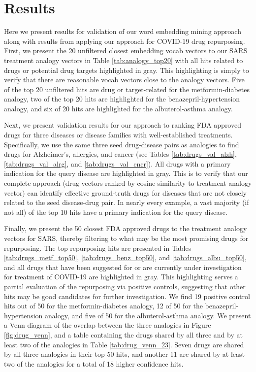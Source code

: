\documentclass{article}
\begin{document}
\section{Results}

Here we present results for validation of our word embedding mining approach along with results from applying our approach for COVID-19 drug repurposing.
First, we present the 20 unfiltered closest embedding vocab vectors to our SARS treatment analogy vectors in Table \ref{tab:analogy_top20} with all hits related to drugs or potential drug targets highlighted in gray.
This highlighting is simply to verify that there are reasonable vocab vectors close to the analogy vectors.
Five of the top 20 unfiltered hits are drug or target-related for the metformin-diabetes analogy, two of the top 20 hits are highlighted for the benazepril-hypertension analogy, and six of 20 hits are highlighted for the albuterol-asthma analogy.

Next, we present validation results for our approach to ranking FDA approved drugs for three diseases or disease families with well-established treatments.
Specifically, we use the same three seed drug-disease pairs as analogies to find drugs for Alzheimer's, allergies, and cancer (see Tables \ref{tab:drugs_val_alzh}, \ref{tab:drugs_val_alrg}, and \ref{tab:drugs_val_cncr}).
All drugs with a primary indication for the query disease are highlighted in gray.
This is to verify that our complete approach (drug vectors ranked by cosine similarity to treatment analogy vector) can identify effective ground-truth drugs for diseases that are not closely related to the seed disease-drug pair.
In nearly every example, a vast majority (if not all) of the top 10 hits have a primary indication for the query disease.

Finally, we present the 50 closest FDA approved drugs to the treatment analogy vectors for SARS, thereby filtering to what may be the most promising drugs for repurposing.
The top repurposing hits are presented in Tables \ref{tab:drugs_metf_top50}, \ref{tab:drugs_benz_top50}, and \ref{tab:drugs_albu_top50}, and all drugs that have been suggested for or are currently under investigation for treatment of COVID-19 are highlighted in gray.
This highlighting serves a partial evaluation of the repurposing via positive controls, suggesting that other hits may be good candidates for further investigation.
We find 19 positive control hits out of 50 for the metformin-diabetes analogy, 12 of 50 for the benazepril-hypertension analogy, and five of 50 for the albuterol-asthma analogy.
We present a Venn diagram of the overlap between the three analogies in Figure \ref{fig:drug_venn}, and a table containing the drugs shared by all three and by at least two of the analogies in Table \ref{tab:drug_venn_23}.
Seven drugs are shared by all three analogies in their top 50 hits, and another 11 are shared by at least two of the analogies for a total of 18 higher confidence hits.
\end{document}
